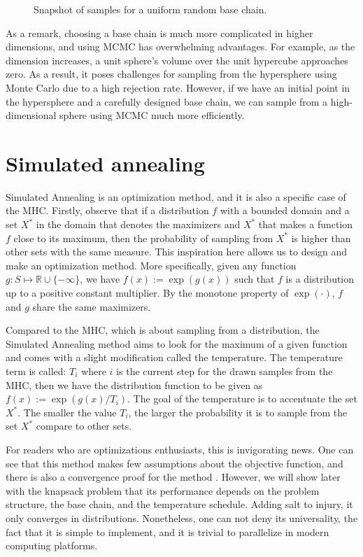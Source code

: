 \documentclass[]{article}
\theoremstyle{definition}
\begin{document}
\begin{figure}[H]
\begin{subfigure}{0.3\textwidth}
            \end{subfigure}
            \caption{Snapshot of samples for a uniform random base chain.}
            \label{fig:unif_rand_bc}
        \end{figure}
        As a remark, choosing a base chain is much more complicated in higher dimensions, and using MCMC has overwhelming advantages. For example, as the dimension increases, a unit sphere's volume over the unit hypercube approaches zero. As a result, it poses challenges for sampling from the hypersphere using Monte Carlo due to a high rejection rate. However, if we have an initial point in the hypersphere and a carefully designed base chain, we can sample from a high-dimensional sphere using MCMC much more efficiently. 

\section{Simulated annealing}
    Simulated Annealing is an optimization method, and it is also a specific case of the MHC. Firstly, observe that if a distribution $f$ with a bounded domain and a set $X^*$ in the domain that denotes the maximizers and $X^*$ that makes a function $f$ close to its maximum, then the probability of sampling from $X^*$ is higher than other sets with the same measure. This inspiration here allows us to design and make an optimization method. More specifically, given any function $g:S \mapsto \mathbb R \cup \{-\infty\}$, we have $f(x):= \exp(g(x))$ such that $f$ is a distribution up to a positive constant multiplier. By the monotone property of $\exp(\cdot)$, $f$ and $g$ share the same maximizers. 
    \par
    Compared to the MHC, which is about sampling from a distribution, the Simulated Annealing method aims to look for the maximum of a given function and comes with a slight modification called the temperature. The temperature term is called: $T_i$ where $i$ is the current step for the drawn samples from the MHC, then we have the distribution function to be given as $f(x):= \exp(g(x)/T_i)$. The goal of the temperature is to accentuate the set $X^*$. The smaller the value $T_i$, the larger the probability it is to sample from the set $X^*$ compare to other sets. 
    \par
    For readers who are optimizations enthusiasts, this is invigorating news. One can see that this method makes few assumptions about the objective function, and there is also a convergence proof for the method \cite{article:sim_anneal_1994}. However, we will show later with the knapsack problem that its performance depends on the problem structure, the base chain, and the temperature schedule. Adding salt to injury, it only converges in distributions. Nonetheless, one can not deny its universality, the fact that it is simple to implement, and it is trivial to parallelize in modern computing platforms. 
\end{document}
